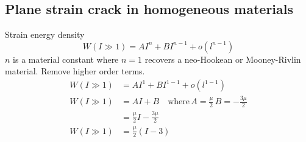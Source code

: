 \documentclass[12pt,3p]{article}
\numberwithin{equation}{section}
\begin{document}
\subsection{Plane strain crack in homogeneous materials}
Strain energy density 
\begin{equation}
W(I \gg 1)=A I^{n}+B I^{n-1}+o\left(l^{n-1}\right)
\end{equation}
$n$ is a material constant where $n = 1$ recovers a neo-Hookean or Mooney-Rivlin material. Remove higher order terms. 
\begin{align*}
W(I \gg 1) &=A I^{1} + B I^{1-1} + o (l^{1-1}) \\
W(I \gg 1) &=A I + B \quad \text{where} \, A = \frac{\mu}{2} \, B = - \frac{3 \mu}{2} \\
		&= \frac{\mu}{2} I - \frac{3 \mu}{2} \\
W(I \gg 1) &= \frac{\mu}{2} (I - 3)
\end{align*}

\end{document}
